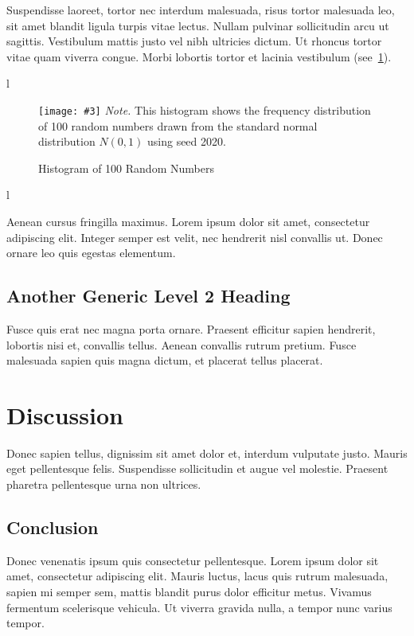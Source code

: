 \documentclass[a4paper,12pt,stu,donotrepeattitle,floatsintext,twoside]{apa7}
\newcommand{\MAEfig}[5]{
    \ifx  l#5 \begin{landscape}\fi
    \begin{figure}[htbp]
        \caption{#2}
        \label{#1}
            \texttt{[image: \#3]}
            \linespread{1.75}\selectfont
            \textit{Note.} #4
    \end{figure}
    \ifx  l#5 \end{landscape}\fi
}
\begin{document}
Suspendisse laoreet, tortor nec interdum malesuada, risus tortor malesuada leo, sit amet blandit ligula turpis vitae lectus. Nullam pulvinar sollicitudin arcu ut sagittis. Vestibulum mattis justo vel nibh ultricies dictum. Ut rhoncus tortor vitae quam viverra congue. Morbi lobortis tortor et lacinia vestibulum (see~\cref{fig:hist}).

\MAEfig{fig:hist}{Histogram of 100 Random Numbers}{hist.eps}{This histogram shows the frequency distribution of 100 random numbers drawn from the standard normal distribution $N(0,1)$ using seed 2020.}{}

Aenean cursus fringilla maximus. Lorem ipsum dolor sit amet, consectetur adipiscing elit. Integer semper est velit, nec hendrerit nisl convallis ut. Donec ornare leo quis egestas elementum.

\subsection{Another Generic Level 2 Heading}

Fusce quis erat nec magna porta ornare. Praesent efficitur sapien hendrerit, lobortis nisi et, convallis tellus. Aenean convallis rutrum pretium. Fusce malesuada sapien quis magna dictum, et placerat tellus placerat.

\section{Discussion}

Donec sapien tellus, dignissim sit amet dolor et, interdum vulputate justo. Mauris eget pellentesque felis. Suspendisse sollicitudin et augue vel molestie. Praesent pharetra pellentesque urna non ultrices.

\subsection{Conclusion}

Donec venenatis ipsum quis consectetur pellentesque. Lorem ipsum dolor sit amet, consectetur adipiscing elit. Mauris luctus, lacus quis rutrum malesuada, sapien mi semper sem, mattis blandit purus dolor efficitur metus. Vivamus fermentum scelerisque vehicula. Ut viverra gravida nulla, a tempor nunc varius tempor.

\printbibliography

\end{document}
